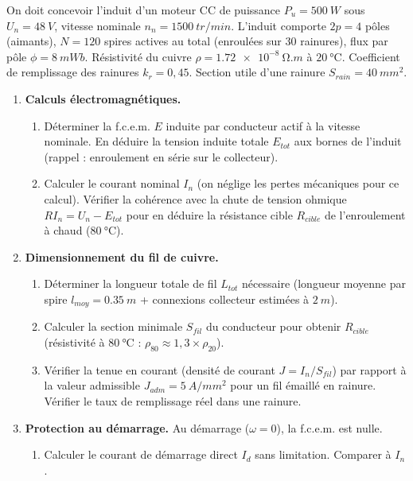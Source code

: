 \documentclass[11pt]{article}
\begin{document}
\begin{exercice}
On doit concevoir l'induit d'un moteur CC de puissance $P_u = \SI{500}{W}$ sous $U_n = \SI{48}{V}$, vitesse nominale $n_n = \SI{1500}{tr/min}$. L'induit comporte $2p = 4$ pôles (aimants), $N = 120$ spires actives au total (enroulées sur $30$ rainures), flux par pôle $\phi = \SI{8}{mWb}$. Résistivité du cuivre $\rho = \SI{1,72e-8}{\ohm.m}$ à $\SI{20}{\celsius}$. Coefficient de remplissage des rainures $k_r = 0,45$. Section utile d'une rainure $S_{rain} = \SI{40}{mm^2}$.

\begin{enumerate}
    \item \textbf{Calculs électromagnétiques.}
    \begin{enumerate}
        \item Déterminer la f.c.e.m. $E$ induite par conducteur actif à la vitesse nominale. En déduire la tension induite totale $E_{tot}$ aux bornes de l'induit (rappel : enroulement en série sur le collecteur).
        \item Calculer le courant nominal $I_n$ (on néglige les pertes mécaniques pour ce calcul). Vérifier la cohérence avec la chute de tension ohmique $R I_n = U_n - E_{tot}$ pour en déduire la résistance cible $R_{cible}$ de l'enroulement à chaud ($\SI{80}{\celsius}$).
    \end{enumerate}
    \item \textbf{Dimensionnement du fil de cuivre.}
    \begin{enumerate}
        \item Déterminer la longueur totale de fil $L_{tot}$ nécessaire (longueur moyenne par spire $l_{moy} = \SI{0,35}{m}$ + connexions collecteur estimées à $\SI{2}{m}$).
        \item Calculer la section minimale $S_{fil}$ du conducteur pour obtenir $R_{cible}$ (résistivité à $\SI{80}{\celsius}$ : $\rho_{80} \approx 1,3 \times \rho_{20}$).
        \item Vérifier la tenue en courant (densité de courant $J = I_n / S_{fil}$) par rapport à la valeur admissible $J_{adm} = \SI{5}{A/mm^2}$ pour un fil émaillé en rainure. Vérifier le taux de remplissage réel dans une rainure.
    \end{enumerate}
    \item \textbf{Protection au démarrage.} Au démarrage ($\omega=0$), la f.c.e.m. est nulle.
    \begin{enumerate}
        \item Calculer le courant de démarrage direct $I_d$ sans limitation. Comparer à $I_n$.

\end{enumerate}
\end{enumerate}
\end{exercice}
\end{document}
